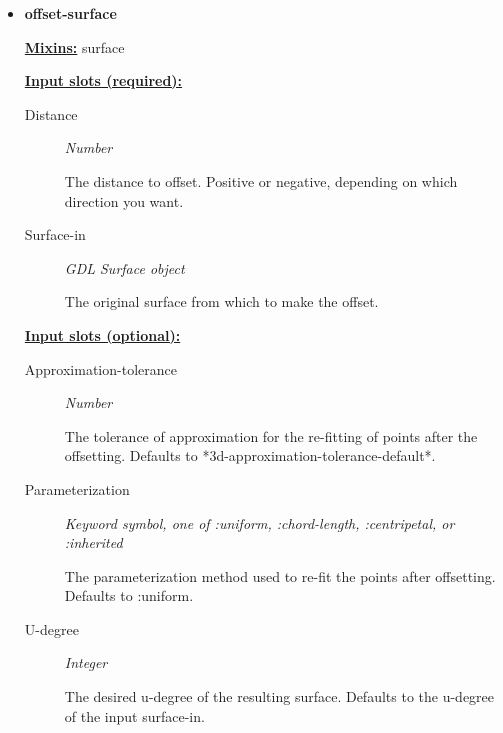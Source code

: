 \documentclass [11pt]{book}
\begin{document}
\begin{itemize}
\item {}
\label{prim:offset-surface}
\textbf{offset-surface}


\textbf{
\underline{Mixins:}} surface











\textbf{
\underline{Input slots (required):}}

\begin{description}

\item [Distance]
\emph{Number}

 The distance to offset. Positive or negative, depending on which direction you want.




\item [Surface-in]
\emph{GDL Surface object}

 The original surface from which to make the offset.




\end{description}






\textbf{
\underline{Input slots (optional):}}

\begin{description}

\item [Approximation-tolerance]
\emph{Number}

 The tolerance of approximation for the re-fitting of points after the offsetting.
Defaults to *3d-approximation-tolerance-default*.




\item [Parameterization]
\emph{Keyword symbol, one of :uniform, :chord-length, :centripetal, or :inherited}

 The parameterization
method used to re-fit the points after offsetting. Defaults to :uniform.




\item [U-degree]
\emph{Integer}

 The desired u-degree of the resulting surface. Defaults to the u-degree of the input surface-in.





\end{description}
\end{itemize}
\end{document}
